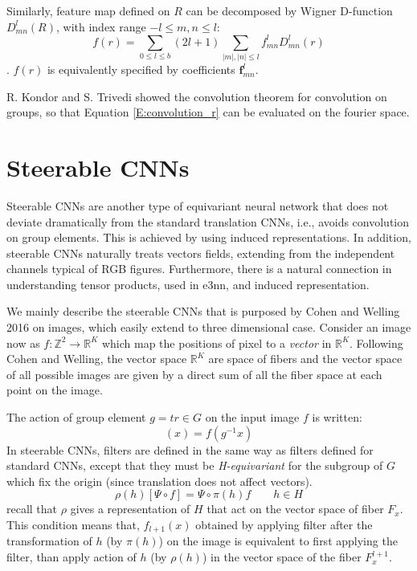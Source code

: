 \documentclass{IEEEtran}
\newcommand{\bbz}{\mathbb{Z}}
\newcommand{\bbr}{\mathbb{R}}
\begin{document}
Similarly, feature map defined on $R$ can be decomposed by Wigner D-function $D_{mn}^l(R)$,
with index range $-l \leq m,n \leq l$:
\begin{equation}
    f(r) = \sum_{0\leq l \leq b} (2l+1) \sum_{|m|,|n|\leq l} f_{mn}^l D_{mn}^l(r)
    \label{E:so3_fft}
\end{equation}.
$f(r)$ is equivalently specified by coefficients $\mathbf{f}_{mn}^l$.

R. Kondor and S. Trivedi showed the convolution theorem for convolution on groups, so that Equation \eqref{E:convolution_r} can be 
evaluated on the fourier space.

\section{Steerable CNNs}
Steerable CNNs are another type of equivariant neural network that does not deviate dramatically from the standard translation CNNs,
i.e., avoids convolution on group elements. This is achieved by using induced representations\cite{serre_linear_1996}.  
In addition, steerable CNNs naturally treats vectors fields, extending from the independent channels typical of RGB figures. 
Furthermore, there is a natural connection in understanding tensor products, used in e3nn, and induced representation. 

We mainly describe the steerable CNNs that is purposed by Cohen and Welling 2016\cite{cohen_steerable_2016} on images, which easily extend to 
three dimensional case. Consider an image now as $f\colon \bbz^2\to \bbr^K$ which map the positions of pixel to 
a \emph{vector} in $\bbr^K$. Following Cohen and Welling, the vector space $\bbr^K$ are space of fibers and the 
vector space of all possible images are given by a direct sum of all the fiber space at each point on the image. 

The action of group element $g=tr \in G$ on the input image $f$ is written:
\begin{equation}
    [\pi(g) f](x) = f(g^{-1}x)
    \label{E:representation_on_input}
\end{equation}
In steerable CNNs, filters are defined in the same way as filters defined for standard CNNs, except that they must
be \emph{H-equivariant} for the subgroup of $G$ which fix the origin (since translation does not affect vectors). 
\begin{equation}
    \label{E:H-equivariant}
    \rho(h)[\Psi \circ f] = \Psi \circ \pi(h)f \qquad h \in H
\end{equation}
recall that $\rho$ gives a representation of $H$ that act on the vector space of fiber $F_x$.
This condition means that, $f_{l+1}(x)$ obtained by applying filter after the transformation of $h$ (by $\pi(h)$) 
on the image is equivalent to first applying the filter, than apply action of $h$ (by $\rho(h)$) in the vector 
space of the fiber $F_{x}^{l+1}$. 
\end{document}
